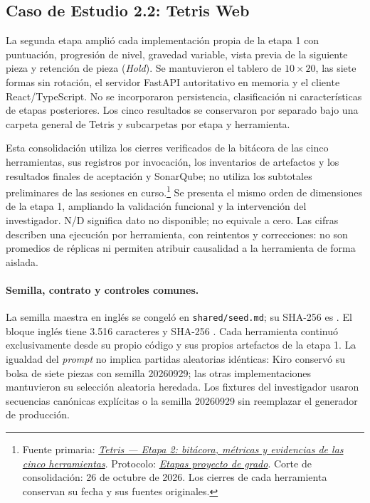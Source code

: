 \subsection{Caso de Estudio 2.2: Tetris Web}
\label{subsec:tetris_complejizacion}

La segunda etapa amplió cada implementación propia de la etapa 1 con puntuación, progresión de nivel, gravedad variable, vista previa de la siguiente pieza y retención de pieza (\textit{Hold}). Se mantuvieron el tablero de $10\times20$, las siete formas sin rotación, el servidor FastAPI autoritativo en memoria y el cliente React/TypeScript. No se incorporaron persistencia, clasificación ni características de etapas posteriores. Los cinco resultados se conservaron por separado bajo una carpeta general de Tetris y subcarpetas por etapa y herramienta.

Esta consolidación utiliza los cierres verificados de la bitácora de las cinco herramientas, sus registros por invocación, los inventarios de artefactos y los resultados finales de aceptación y SonarQube; no utiliza los subtotales preliminares de las sesiones en curso.\footnote{Fuente primaria: \href{https://docs.google.com/document/d/1JRZvjK8-fdFitwbiKLe2NhOsk1FZNCa_TclgnFwdjao}{\textit{Tetris --- Etapa 2: bitácora, métricas y evidencias de las cinco herramientas}}. Protocolo: \href{https://docs.google.com/document/d/1Fi7XAKY2Cd379spmq7ggxgoE0rEjKx6pq66hTdLj-6c}{\textit{Etapas proyecto de grado}}. Corte de consolidación: 26 de octubre de 2026. Los cierres de cada herramienta conservan su fecha y sus fuentes originales.} Se presenta el mismo orden de dimensiones de la etapa 1, ampliando la validación funcional y la intervención del investigador. N/D significa dato no disponible; no equivale a cero. Las cifras describen una ejecución por herramienta, con reintentos y correcciones: no son promedios de réplicas ni permiten atribuir causalidad a la herramienta de forma aislada.

\paragraph{Semilla, contrato y controles comunes.}
La semilla maestra en inglés se congeló en \texttt{shared/seed.md}; su SHA-256 es . El bloque inglés tiene 3.516 caracteres y SHA-256 . Cada herramienta continuó exclusivamente desde su propio código y sus propios artefactos de la etapa 1. La igualdad del \textit{prompt} no implica partidas aleatorias idénticas: Kiro conservó su bolsa de siete piezas con semilla 20260929; las otras implementaciones mantuvieron su selección aleatoria heredada. Los fixtures del investigador usaron secuencias canónicas explícitas o la semilla 20260929 sin reemplazar el generador de producción.

